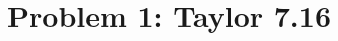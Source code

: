 \documentclass[a4paper,12pt]{article}
\begin{document}
\section*{Problem 1: Taylor 7.16}
\end{document}
